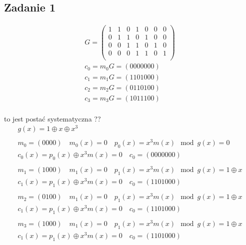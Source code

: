 \documentclass[12pt]{article}
\begin{document}
\subsection*{Zadanie 1}
\begin{align*}
    G=
    \begin{pmatrix}
        1 & 1 & 0 & 1 & 0  & 0 & 0 \\
        0 & 1 & 1 & 0 & 1  & 0 & 0 \\
        0 & 0 & 1 & 1 & 0  & 1 & 0\\
        0 & 0 & 0 & 1 & 1  & 0 & 1\\
    \end{pmatrix} \\ 
    c_0 = m_0G = (0000000) \\
    c_1 = m_1G = (1101000) \\
    c_2 = m_2G = (0110100) \\
    c_3 = m_3G = (1011100) \\
\end{align*}

to jest postać systematyczna ??
\begin{align*}
    g(x) = 1 \oplus x \oplus x^3 \\
    \\
    m_0 = (0000) \quad m_0(x) = 0 \quad p_0(x) = x^3 m(x) \mod g(x) = 0 \\
    c_0(x) = p_0(x) \oplus x^3 m(x)=0  \quad c_0 = (0000000) \\
    \\
    m_1 = (1000) \quad m_1(x) = 0 \quad p_1(x) = x^3 m(x) \mod g(x) = 1\oplus x \\
    c_1(x) = p_1(x) \oplus x^3 m(x)=0  \quad c_0 = (1101000) \\
    \\
    m_2 = (0100) \quad m_1(x) = 0 \quad p_1(x) = x^3 m(x) \mod g(x) = 1\oplus x \\
    c_1(x) = p_1(x) \oplus x^3 m(x)=0  \quad c_0 = (1101000) \\
    \\
    m_3 = (1000) \quad m_1(x) = 0 \quad p_1(x) = x^3 m(x) \mod g(x) = 1\oplus x \\
    c_1(x) = p_1(x) \oplus x^3 m(x)=0  \quad c_0 = (1101000) \\
    \\
\end{align*}
\end{document}
